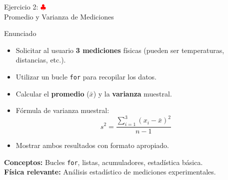 \documentclass[10pt]{beamer}
\begin{document}
\begin{frame}{Ejercicio 2: \hfill \textcolor{red}{$\clubsuit$} \\ Promedio y Varianza de Mediciones}
  \begin{block}{Enunciado}
    \begin{itemize}
      \item Solicitar al usuario \textbf{3 mediciones} físicas (pueden ser temperaturas, distancias, etc.).
      \item Utilizar un bucle \texttt{for} para recopilar los datos.
      \item Calcular el \textbf{promedio} (\(\bar{x}\)) y la \textbf{varianza} muestral.
      \item Fórmula de varianza muestral:
      \[
        s^2 = \frac{\sum_{i=1}^{3}(x_i - \bar{x})^2}{n - 1}
      \]
      \item Mostrar ambos resultados con formato apropiado.
    \end{itemize}
  \end{block}
  
  \textbf{Conceptos:} Bucles \texttt{for}, listas, acumuladores, estadística básica.
  \\
  \textbf{Física relevante:} Análisis estadístico de mediciones experimentales.
\end{frame}
\end{document}
